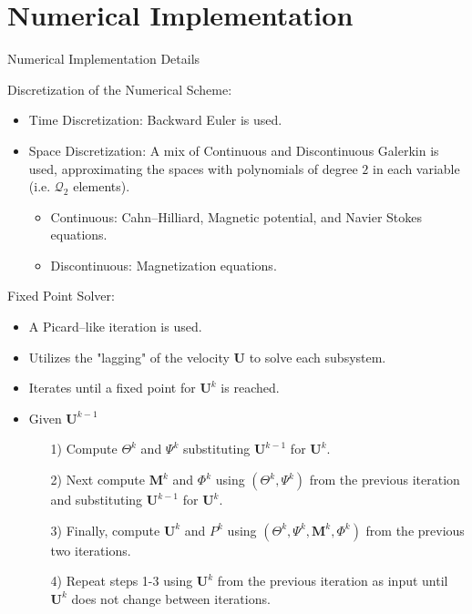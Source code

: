 \documentclass[9pt]{beamer}
\begin{document}
\section{Numerical Implementation}
\begin{frame}{Numerical Implementation Details}

Discretization of the Numerical Scheme:
\begin{itemize}
	\item Time Discretization: Backward Euler is used.
	\item Space Discretization: A mix of Continuous and Discontinuous Galerkin is used, approximating the spaces with polynomials of degree $2$ in each variable (i.e. $\mathcal{Q}_2$ elements).
	\begin{itemize}
		\item Continuous: Cahn--Hilliard, Magnetic potential, and Navier Stokes equations.
		\item Discontinuous: Magnetization equations.
	\end{itemize}
\end{itemize}

Fixed Point Solver:
\begin{itemize}
	\item A Picard--like iteration is used.
	\item Utilizes the "lagging" of the velocity $\mathbf{U}$ to solve each subsystem.
	\item Iterates until a fixed point for $\mathbf{U}^k$ is reached.
	\item Given $\mathbf{U}^{k-1}$ 
	\begin{itemize}
		\item[1)] Compute $\Theta^k$ and $\Psi^k$ substituting $\mathbf{U}^{k-1}$ for $\mathbf{U}^{k}$.
		
		\item[2)] Next compute $\mathbf{M}^k$ and $\Phi^k$ using $(\Theta^k,\Psi^k)$ from the previous iteration and substituting $\mathbf{U}^{k-1}$ for $\mathbf{U}^{k}$.
		
		\item[3)] Finally, compute $\mathbf{U}^k$ and $P^k$ using $(\Theta^k,\Psi^k, \mathbf{M}^k, \Phi^k)$ from the previous two iterations.
		
		\item[4)] Repeat steps 1-3 using $\mathbf{U}^k$ from the previous iteration as input until $\mathbf{U}^k$ does not change between iterations.
	\end{itemize}
\end{itemize}
\end{frame}
\end{document}
